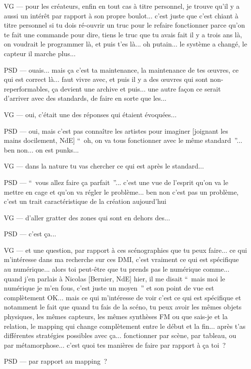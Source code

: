VG — pour les créateurs, enfin en tout cas à titre personnel,  je trouve qu'il y a aussi un intérêt par rapport à son propre boulot... c'est juste que c'est chiant à titre personnel si tu dois ré-ouvrir un truc pour le refaire fonctionner parce qu'on te fait une commande pour dire, tiens le truc que tu avais fait il y a trois ans là, on voudrait le programmer là, et puis t'es là... oh putain... le système a changé, le capteur il marche plus...

PSD — ouais... mais ça c'est ta maintenance, la maintenance de tes œuvres, ce qui est correct là... faut vivre avec, et puis il y a des œuvres qui sont non-reperformables, ça devient une archive et puis... une autre façon ce serait d'arriver avec des standards, de faire en sorte que les...

VG — oui, c'était une des réponses qui étaient évoquées...

PSD — oui, mais c'est pas connaître les artistes pour imaginer [joignant les mains docilement, NdE] “ oh, on va tous fonctionner avec le même standard ”... ben non... on est punks...

VG — dans la nature tu vas chercher ce qui est après le standard...

PSD — “ vous allez faire ça parfait ”... c'est une vue de l'esprit qu'on va le mettre en cage et qu'on va régler le problème... ben non c'est pas un problème, c'est un trait caractéristique de la création aujourd'hui

VG — d'aller gratter des zones qui sont en dehors des...

PSD — c'est ça...

VG — et une question, par rapport à ces scénographies que tu peux faire... ce qui m'intéresse dans ma recherche sur ces DMI, c'est vraiment ce qui est spécifique au numérique... alors toi peut-être que tu prends pas le numérique comme... quand j'en parlais à Nicolas [Bernier, NdE] hier, il me disait “ mais moi le numérique je m'en fous, c'est juste un moyen ” et son point de vue est complètement OK... mais ce qui m'intéresse de voir c'est ce qui est spécifique et notamment le fait que quand tu fais de la scéno, tu peux avoir les mêmes objets physiques, les mêmes capteurs, les mêmes synthèses FM ou que sais-je et la relation, le mapping qui change complètement entre le début et la fin... après t'as différentes stratégies possibles avec ça... fonctionner par scène, par tableau, ou par métamorphose... c'est quoi tes manières de faire par rapport à ça toi ?

PSD — par rapport au mapping ?

